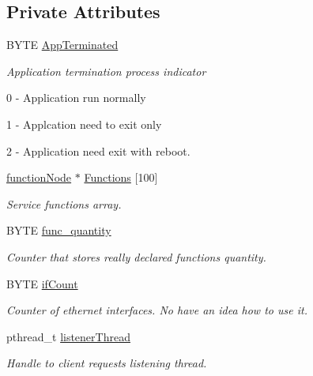\subsection*{Private Attributes}
\begin{DoxyCompactItemize}
\item 
BYTE \hyperlink{classsrvAppLayer_ac2a9f0ca78a68720275b14eac924fc62}{AppTerminated}
\begin{DoxyCompactList}\small\item\em Application termination process indicator
\begin{DoxyItemize}
\item 0 -\/ Application run normally
\item 1 -\/ Applcation need to exit only
\item 2 -\/ Application need exit with reboot. 
\end{DoxyItemize}\item\end{DoxyCompactList}\item 
\hyperlink{classfunctionNode}{functionNode} $\ast$ \hyperlink{classsrvAppLayer_acaa27fb3d6e77e02afd272975c730c10}{Functions} \mbox{[}100\mbox{]}
\begin{DoxyCompactList}\small\item\em Service functions array. \item\end{DoxyCompactList}\item 
BYTE \hyperlink{classsrvAppLayer_ae6b6a999a1e0da7f17da9aba933f1f6b}{func\_\-quantity}
\begin{DoxyCompactList}\small\item\em Counter that stores really declared functions quantity. \item\end{DoxyCompactList}\item 
BYTE \hyperlink{classsrvAppLayer_a24850f0f199b20e7b5a146a034bfbb69}{ifCount}
\begin{DoxyCompactList}\small\item\em Counter of ethernet interfaces. No have an idea how to use it. \item\end{DoxyCompactList}\item 
pthread\_\-t \hyperlink{classsrvAppLayer_ae836e655cb632038b45ed12c0c646994}{listenerThread}
\begin{DoxyCompactList}\small\item\em Handle to client requests listening thread. \item\end{DoxyCompactList}\item 

\end{DoxyCompactItemize}
